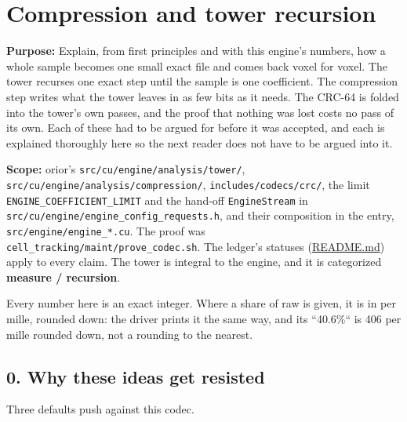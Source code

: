 \chapter{\texorpdfstring{Compression and tower recursion}{Compression and tower recursion}}
\label{chap:compression-tower}

\textbf{Purpose:} Explain, from first principles and with this engine's numbers, how a whole sample becomes one small exact file and comes back voxel for voxel. The tower recurses one exact step until the sample is one coefficient. The compression step writes what the tower leaves in as few bits as it needs. The CRC-64 is folded into the tower's own passes, and the proof that nothing was lost costs no pass of its own. Each of these had to be argued for before it was accepted, and each is explained thoroughly here so the next reader does not have to be argued into it.

\textbf{Scope:} orior's \texttt{src/\allowbreak{}cu/\allowbreak{}engine/\allowbreak{}analysis/\allowbreak{}tower/\allowbreak{}}, \texttt{src/\allowbreak{}cu/\allowbreak{}engine/\allowbreak{}analysis/\allowbreak{}compression/\allowbreak{}}, \texttt{includes/\allowbreak{}codecs/\allowbreak{}crc/\allowbreak{}}, the limit \texttt{ENGINE\_\allowbreak{}COEFFICIENT\_\allowbreak{}LIMIT} and the hand-off \texttt{Engine\allowbreak{}Stream} in \texttt{src/\allowbreak{}cu/\allowbreak{}engine/\allowbreak{}engine\_\allowbreak{}config\_\allowbreak{}requests.\allowbreak{}h}, and their composition in the entry, \texttt{src/\allowbreak{}engine/\allowbreak{}engine\_\allowbreak{}*.\allowbreak{}cu}. The proof was \texttt{cell\_\allowbreak{}tracking/\allowbreak{}maint/\allowbreak{}prove\_\allowbreak{}codec.\allowbreak{}sh}. The ledger's statuses (\hyperref[chap:readme]{README.md}) apply to every claim. The tower is integral to the engine, and it is categorized \textbf{measure / recursion}.

Every number here is an exact integer. Where a share of raw is given, it is in per mille, rounded down: the driver prints it the same way, and its “40.6\%“ is 406 per mille rounded down, not a rounding to the nearest.

\section{\texorpdfstring{0. Why these ideas get resisted}{0. Why these ideas get resisted}}

Three defaults push against this codec.

